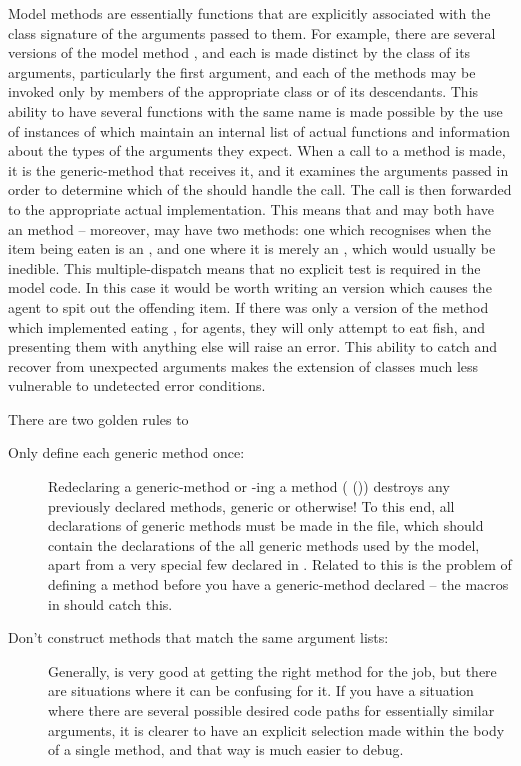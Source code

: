 Model methods are essentially functions that are explicitly associated
with the class signature of the arguments passed to them. For example,
there are several versions of the model method , and each
is made distinct by the class of its arguments, particularly the first
argument, and each of the methods may be invoked only by members of
the appropriate class or of its descendants.  This ability to have
several functions with the same name is made possible by the use of
instances of  which maintain an internal list
of actual functions and information about the types of the arguments
they expect. When a call to a method is made, it is the generic-method
that receives it, and it examines the arguments passed in order to
determine which of the  should handle the call.
The call is then forwarded to the appropriate actual implementation.
This means that and  may both have an
 method -- moreover,  may have two
 methods: one which recognises when the item being eaten
is an , and one where it is merely an ,
which would usually be inedible.  This multiple-dispatch means that no
explicit test is required in the model code.  In this case it would be
worth writing an  version which causes the agent
to spit out the offending item.  If there was only a version of
the  method which implemented eating ,
for  agents, they will only attempt to eat fish, and
presenting them with anything else will raise an error.  This ability
to catch and recover from unexpected arguments makes
the extension of classes much less vulnerable to undetected error
conditions. 

There are two golden rules to 
\begin{description}
  \item[Only define each generic method once:] Redeclaring a
    generic-method or -ing a method
    (  ()) destroys
    any previously declared  methods, generic or
    otherwise! To this end, all declarations of generic methods must
    be made in the  file, which
    should contain the declarations of the all generic methods used by
    the model, apart from a very special few declared in .
    Related to this is the problem of defining a method
    before you have a generic-method declared -- the macros
    in  should catch this.
    \item[Don't construct methods that match the same argument lists:]
    Generally, \SCLOS is very good at getting the right method for the
    job, but there are situations where it can be confusing for it.
    If you have a situation where there are several possible desired
    code paths for essentially similar arguments, it is clearer to
    have an explicit selection made within the body of a single
    method, and that way is much easier to debug.
\end{description}
 
